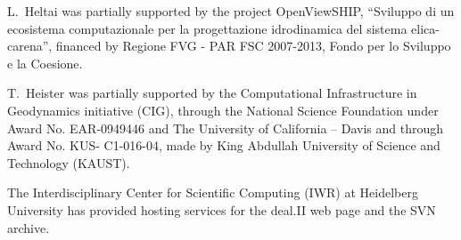 \documentclass{ansarticle}
\begin{document}
L.~Heltai was partially supported by the project OpenViewSHIP,
``Sviluppo di un ecosistema computazionale per la progettazione
idrodinamica del sistema elica-carena'', financed by Regione FVG - PAR
FSC 2007-2013, Fondo per lo Sviluppo e la Coesione.

T.~Heister was partially supported by the Computational Infrastructure in
Geodynamics initiative (CIG), through the National Science Foundation under Award
No. EAR-0949446 and The University of California -- Davis and through Award No. KUS-
C1-016-04, made by King Abdullah University of Science and Technology (KAUST).

The Interdisciplinary Center for Scientific Computing (IWR) at Heidelberg University has provided 
hosting services for the deal.II web page and the SVN archive.
 






{}

\end{document}
